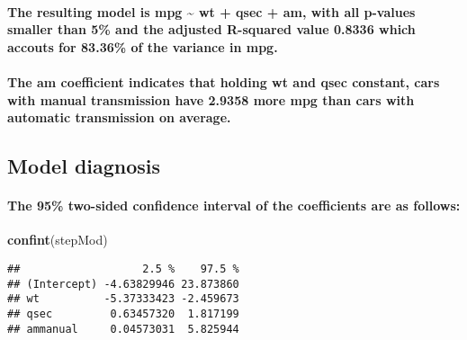\documentclass[]{article}
\newenvironment{Shaded}{\begin{snugshade}}{\end{snugshade}}
\newcommand{\KeywordTok}[1]{\textcolor[rgb]{0.13,0.29,0.53}{\textbf{#1}}}
\newcommand{\NormalTok}[1]{#1}
\let\oldparagraph\paragraph
\renewcommand{\paragraph}[1]{\oldparagraph{#1}\mbox{}}
\begin{document}
\hypertarget{the-resulting-model-is-mpg-wt-qsec-am-with-all-p-values-smaller-than-5-and-the-adjusted-r-squared-value-0.8336-which-accouts-for-83.36-of-the-variance-in-mpg.}{%
\paragraph{The resulting model is mpg \textasciitilde{} wt + qsec + am,
with all p-values smaller than 5\% and the adjusted R-squared value
0.8336 which accouts for 83.36\% of the variance in
mpg.}\label{the-resulting-model-is-mpg-wt-qsec-am-with-all-p-values-smaller-than-5-and-the-adjusted-r-squared-value-0.8336-which-accouts-for-83.36-of-the-variance-in-mpg.}}

\hypertarget{the-am-coefficient-indicates-that-holding-wt-and-qsec-constant-cars-with-manual-transmission-have-2.9358-more-mpg-than-cars-with-automatic-transmission-on-average.}{%
\paragraph{The am coefficient indicates that holding wt and qsec
constant, cars with manual transmission have 2.9358 more mpg than cars
with automatic transmission on
average.}\label{the-am-coefficient-indicates-that-holding-wt-and-qsec-constant-cars-with-manual-transmission-have-2.9358-more-mpg-than-cars-with-automatic-transmission-on-average.}}

\hypertarget{model-diagnosis}{%
\subsection{Model diagnosis}\label{model-diagnosis}}

\hypertarget{the-95-two-sided-confidence-interval-of-the-coefficients-are-as-follows}{%
\paragraph{The 95\% two-sided confidence interval of the coefficients
are as
follows:}\label{the-95-two-sided-confidence-interval-of-the-coefficients-are-as-follows}}

\begin{Shaded}
\begin{Highlighting}[]
\KeywordTok{confint}\NormalTok{(stepMod)}
\end{Highlighting}
\end{Shaded}

\begin{verbatim}
##                   2.5 %    97.5 %
## (Intercept) -4.63829946 23.873860
## wt          -5.37333423 -2.459673
## qsec         0.63457320  1.817199
## ammanual     0.04573031  5.825944
\end{verbatim}
\end{document}
